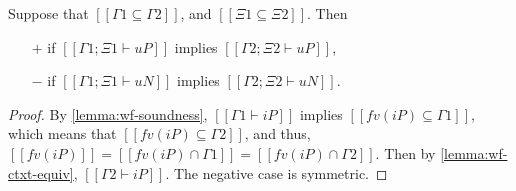 \begin{corollary}
  \label{lemma:wf-weakening-algo}
  Suppose that $[[Γ1 ⊆ Γ2]]$,
  and $[[Ξ1 ⊆ Ξ2]]$. Then
  \begin{itemize}
    \item[$+$] if $[[Γ1 ; Ξ1 ⊢ uP]]$ implies $[[Γ2 ; Ξ2 ⊢ uP]]$,
    \item [$-$] if $[[Γ1 ; Ξ1 ⊢ uN]]$ implies $[[Γ2 ; Ξ2 ⊢ uN]]$.
  \end{itemize}
\end{corollary}
\begin{proof}
  By \cref{lemma:wf-soundness},
  $[[Γ1 ⊢ iP]]$ implies $[[fv(iP) ⊆ Γ1]]$,
  which means that $[[fv(iP) ⊆ Γ2]]$,
  and thus, $[[fv(iP)]] = [[fv(iP) ∩ Γ1]] = [[fv(iP) ∩ Γ2]]$.
  Then by \cref{lemma:wf-ctxt-equiv}, $[[Γ2 ⊢ iP]]$. 
  The negative case is symmetric.
\end{proof}